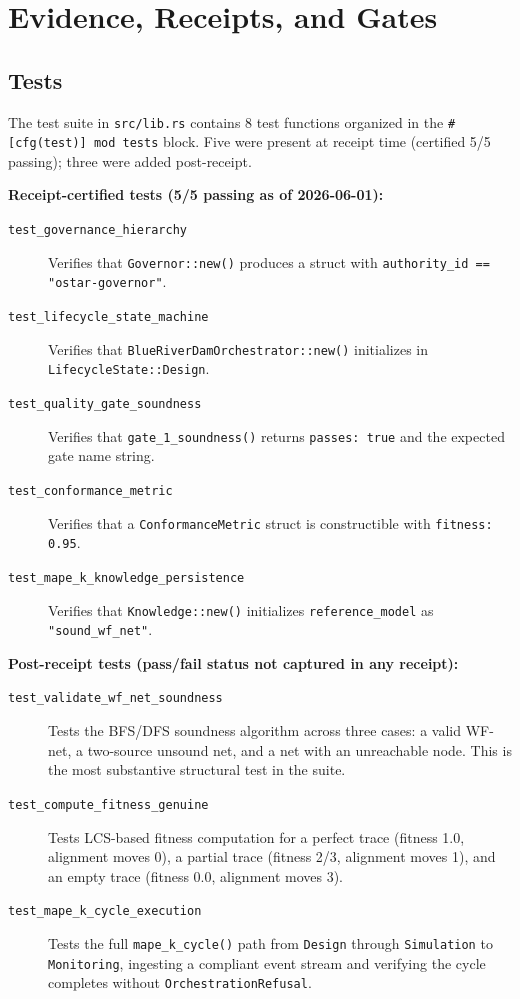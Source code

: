 
\section{Evidence, Receipts, and Gates}
\label{sec:blue-river-dam-evidence}

\subsection{Tests}
\label{sec:blue-river-dam-evidence-tests}

The test suite in \texttt{src/lib.rs} contains 8 test functions organized in
the \texttt{\#[cfg(test)] mod tests} block. Five were present at receipt time
(certified 5/5 passing); three were added post-receipt.

\textbf{Receipt-certified tests (5/5 passing as of 2026-06-01):}
\begin{description}
  \item[\texttt{test\_governance\_hierarchy}] Verifies that
    \texttt{Governor::new()} produces a struct with
    \texttt{authority\_id == "ostar-governor"}.
  \item[\texttt{test\_lifecycle\_state\_machine}] Verifies that
    \texttt{BlueRiverDamOrchestrator::new()} initializes in
    \texttt{LifecycleState::Design}.
  \item[\texttt{test\_quality\_gate\_soundness}] Verifies that
    \texttt{gate\_1\_soundness()} returns \texttt{passes: true} and the
    expected gate name string.
  \item[\texttt{test\_conformance\_metric}] Verifies that a
    \texttt{ConformanceMetric} struct is constructible with \texttt{fitness:
    0.95}.
  \item[\texttt{test\_mape\_k\_knowledge\_persistence}] Verifies that
    \texttt{Knowledge::new()} initializes \texttt{reference\_model} as
    \texttt{"sound\_wf\_net"}.
\end{description}

\textbf{Post-receipt tests (pass/fail status not captured in any receipt):}
\begin{description}
  \item[\texttt{test\_validate\_wf\_net\_soundness}] Tests the BFS/DFS soundness
    algorithm across three cases: a valid WF-net, a two-source unsound net, and
    a net with an unreachable node. This is the most substantive structural
    test in the suite.
  \item[\texttt{test\_compute\_fitness\_genuine}] Tests LCS-based fitness
    computation for a perfect trace (fitness 1.0, alignment moves 0), a partial
    trace (fitness 2/3, alignment moves 1), and an empty trace (fitness 0.0,
    alignment moves 3).
  \item[\texttt{test\_mape\_k\_cycle\_execution}] Tests the full
    \texttt{mape\_k\_cycle()} path from \texttt{Design} through
    \texttt{Simulation} to \texttt{Monitoring}, ingesting a compliant event
    stream and verifying the cycle completes without \texttt{OrchestrationRefusal}.
\end{description}


